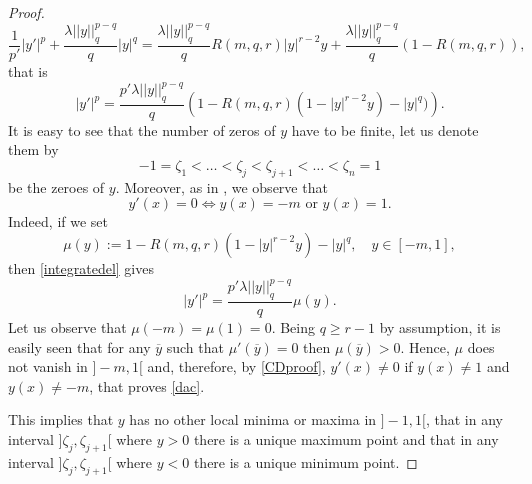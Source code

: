 \documentclass{amsart}
\theoremstyle{definition}
\theoremstyle{remark}
\begin{document}
\begin{proof}
\begin{equation}
\frac{1}{p'} |y'|^p + \frac{\lambda  ||y||_q^{p-q} }q  |y|^q  = \frac{\lambda  ||y||_q^{p-q} }{q} R\left(m,q,r\right) |y|^{r-2}y + \frac{\lambda  ||y||_q^{p-q} }{q} \left (1-R\left(m,q,r\right)\right),
\end{equation}
that is
\begin{equation}
\label{integratedel}
|y'|^p=\frac{p' \lambda   ||y||_q^{p-q}}{q}\left(1-R\left( m,q,r\right)(1- |y|^{r-2}y) - |y|^q)\right).
\end{equation}
It is easy to see that the number of zeros of $y$ have to be finite, let us denote them by 
\[
-1=\zeta_{1}<\ldots<\zeta_{j}<\zeta_{j+1}<\ldots<\zeta_{n}=1
\] 
be the zeroes of $y$. Moreover, as in \cite{CD}, we observe that
\begin{equation}
\label{dac}
y'(x)=0 \iff y(x)=- m\text{ or }y(x)=1.
\end{equation}
Indeed, if we set
\[
\mu (y):=1-R\left(m,q,r\right)(1-|y|^{r-2}y)-|y|^{q},\quad y\in \left[- m,1\right],
\]
then \eqref{integratedel} gives
\begin{equation}
\label{CDproof}
\left| y'\right|^{p}=\frac{p' \lambda  ||y||_q^{p-q} }{q} \mu\left( y\right).
\end{equation}
Let us observe that $\mu(- m)=\mu(1)=0$. Being $q\ge r-1$ by assumption, it is easily seen that for any $\overline y$ such that $\mu'(\overline y)=0$ then $\mu(\overline y)>0$. Hence, $\mu$ does not vanish in $]-m,1[$ and, therefore, by \eqref{CDproof}, $y'(x)\ne 0$ if $y(x)\ne 1$ and ${y(x)}\ne - m$, that proves \eqref{dac}.

This implies that $y$ has no other local minima or maxima in $]-1,1[$, that in any interval $]\zeta_{j},\zeta_{j+1}[$ where $y>0$ there is a unique maximum point and that in any interval $]\zeta_{j},\zeta_{j+1}[$ where $y<0$ there is a unique minimum point. 


\end{proof}
\end{document}
